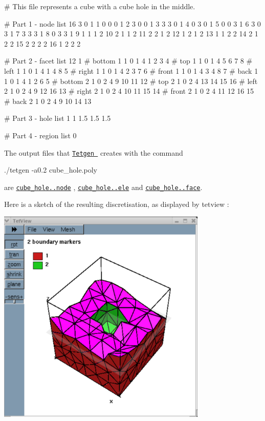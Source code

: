 \begin{DoxyCodeInclude}
# This file represents a cube with a cube hole in the middle.

# Part 1 - node list
16 3 0 1
1    0 0 0 1
2    3 0 0 1 
3    3 3 0 1
4    0 3 0 1
5    0 0 3 1
6    3 0 3 1
7    3 3 3 1
8    0 3 3 1
9    1 1 1 2
10   2 1 1 2
11   2 2 1 2
12   1 2 1 2
13   1 1 2 2
14   2 1 2 2
15   2 2 2 2
16   1 2 2 2

# Part 2 - facet list
12 1
# bottom 1
1 0 1
4 1 2 3 4
# top 1
1 0 1
4 5 6 7 8
# left 1
1 0 1
4 1 4 8 5
# right 1
1 0 1
4 2 3 7 6
# front 1
1 0 1
4 3 4 8 7
# back 1
1 0 1
4 1 2 6 5
# bottom 2
1 0 2
4 9 10 11 12
# top 2
1 0 2
4 13 14 15 16
# left 2
1 0 2
4 9 12 16 13
# right 2
1 0 2
4 10 11 15 14
# front 2
1 0 2
4 11 12 16 15
# back 2
1 0 2
4 9 10 14 13

# Part 3 - hole list
1
1 1.5 1.5 1.5 

# Part 4 - region list
0
\end{DoxyCodeInclude}


The output files that \href{http://wias-berlin.de/software/tetgen//}{\tt {\ttfamily Tetgen} } creates with the command 
\begin{DoxyCode}
./tetgen  -a0.2 cube\_hole.poly 
\end{DoxyCode}
 are \href{../../../../demo_drivers/meshing/mesh_from_tetgen/cube_hole.1.node}{\tt cube\+\_\+hole..\+node} , \href{../../../../demo_drivers/meshing/mesh_from_tetgen/cube_hole.1.ele}{\tt cube\+\_\+hole..\+ele} and \href{../../../../demo_drivers/meshing/mesh_from_tetgen/cube_hole.1.face}{\tt cube\+\_\+hole..\+face}.

Here is a sketch of the resulting discretisation, as displayed by {\ttfamily tetview} \+:

 
\begin{DoxyImage}
\includegraphics[width=0.75\textwidth]{tetview_screenshot}
\end{DoxyImage}




